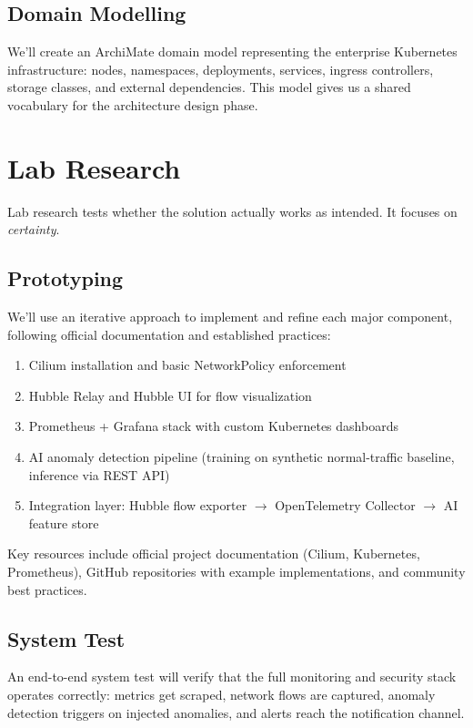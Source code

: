 \subsection{Domain Modelling}
We'll create an ArchiMate domain model representing the enterprise Kubernetes infrastructure: nodes, namespaces, deployments, services, ingress controllers, storage classes, and external dependencies. This model gives us a shared vocabulary for the architecture design phase.

\section{Lab Research}

Lab research tests whether the solution actually works as intended. It focuses on \emph{certainty}.

\subsection{Prototyping}
We'll use an iterative approach to implement and refine each major component, following official documentation and established practices:
\begin{enumerate}
    \item Cilium installation and basic NetworkPolicy enforcement
    \item Hubble Relay and Hubble UI for flow visualization
    \item Prometheus + Grafana stack with custom Kubernetes dashboards
    \item AI anomaly detection pipeline (training on synthetic normal-traffic baseline, inference via REST API)
    \item Integration layer: Hubble flow exporter $\rightarrow$ OpenTelemetry Collector $\rightarrow$ AI feature store
\end{enumerate}
Key resources include official project documentation (Cilium, Kubernetes, Prometheus), GitHub repositories with example implementations, and community best practices.

\subsection{System Test}
An end-to-end system test will verify that the full monitoring and security stack operates correctly: metrics get scraped, network flows are captured, anomaly detection triggers on injected anomalies, and alerts reach the notification channel.

